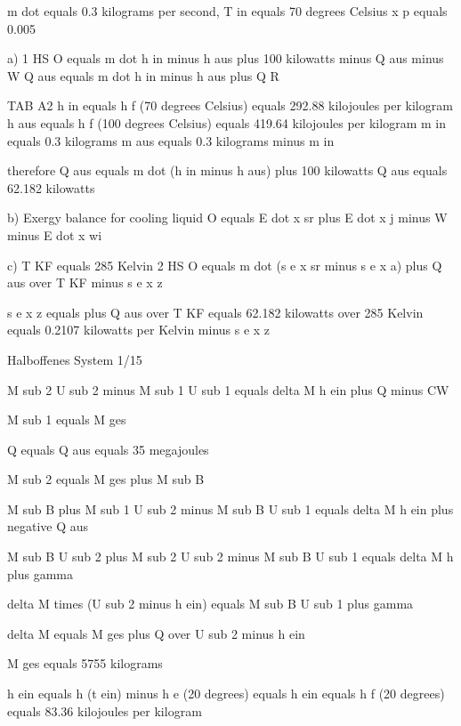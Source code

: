 m dot equals 0.3 kilograms per second, T in equals 70 degrees Celsius  
x p equals 0.005  

a) 1 HS O equals m dot h in minus h aus plus 100 kilowatts minus Q aus minus W  
Q aus equals m dot h in minus h aus plus Q R  

TAB A2  
h in equals h f (70 degrees Celsius) equals 292.88 kilojoules per kilogram  
h aus equals h f (100 degrees Celsius) equals 419.64 kilojoules per kilogram  
m in equals 0.3 kilograms  
m aus equals 0.3 kilograms minus m in  

therefore Q aus equals m dot (h in minus h aus) plus 100 kilowatts  
Q aus equals 62.182 kilowatts  

b) Exergy balance for cooling liquid  
O equals E dot x sr plus E dot x j minus W minus E dot x wi  

c) T KF equals 285 Kelvin  
2 HS O equals m dot (s e x sr minus s e x a) plus Q aus over T KF minus s e x z  

s e x z equals plus Q aus over T KF equals 62.182 kilowatts over 285 Kelvin equals 0.2107 kilowatts per Kelvin minus s e x z

Halboffenes System 1/15

M sub 2 U sub 2 minus M sub 1 U sub 1 equals delta M h ein plus Q minus CW

M sub 1 equals M ges

Q equals Q aus equals 35 megajoules

M sub 2 equals M ges plus M sub B

M sub B plus M sub 1 U sub 2 minus M sub B U sub 1 equals delta M h ein plus negative Q aus

M sub B U sub 2 plus M sub 2 U sub 2 minus M sub B U sub 1 equals delta M h plus gamma

delta M times (U sub 2 minus h ein) equals M sub B U sub 1 plus gamma

delta M equals M ges plus Q over U sub 2 minus h ein

M ges equals 5755 kilograms

h ein equals h (t ein) minus h e (20 degrees) equals h ein equals h f (20 degrees) equals 83.36 kilojoules per kilogram